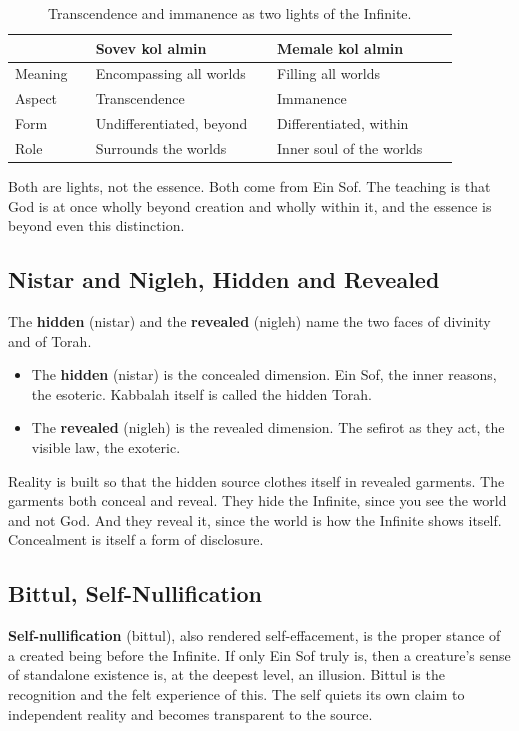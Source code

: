 \begin{longtable}{L{0.16\linewidth} L{0.36\linewidth} L{0.36\linewidth}}
\caption{Transcendence and immanence as two lights of the Infinite.}\\
\toprule
 & \textbf{Sovev kol almin} & \textbf{Memale kol almin} \\
\midrule
Meaning & Encompassing all worlds & Filling all worlds \\
Aspect & Transcendence & Immanence \\
Form & Undifferentiated, beyond & Differentiated, within \\
Role & Surrounds the worlds & Inner soul of the worlds \\
\bottomrule
\end{longtable}

Both are lights, not the essence. Both come from Ein Sof. The teaching is that God
is at once wholly beyond creation and wholly within it, and the essence is beyond
even this distinction.

\subsection{Nistar and Nigleh, Hidden and Revealed}

The \textbf{hidden} (nistar) and the \textbf{revealed} (nigleh) name
the two faces of divinity and of Torah.

\begin{itemize}
 \item The \textbf{hidden} (nistar) is the concealed dimension. Ein Sof, the inner
 reasons, the esoteric. Kabbalah itself is called the hidden Torah.
 \item The \textbf{revealed} (nigleh) is the revealed dimension. The sefirot as they
 act, the visible law, the exoteric.
\end{itemize}

Reality is built so that the hidden source clothes itself in revealed garments. The
garments both conceal and reveal. They hide the Infinite, since you see the world
and not God. And they reveal it, since the world is how the Infinite shows itself.
Concealment is itself a form of disclosure.

\subsection{Bittul, Self-Nullification}

\textbf{Self-nullification} (bittul), also rendered self-effacement, is the proper
stance of a created being before the Infinite. If only Ein Sof truly is, then a
creature's sense of standalone existence is, at the deepest level, an illusion.
Bittul is the recognition and the felt experience of this. The self quiets its own
claim to independent reality and becomes transparent to the source.

